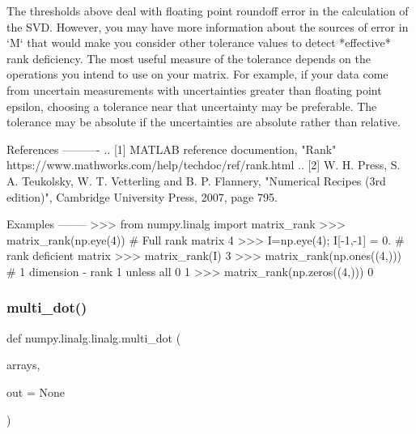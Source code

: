 \begin{DoxyVerb}
The thresholds above deal with floating point roundoff error in the
calculation of the SVD.  However, you may have more information about the
sources of error in `M` that would make you consider other tolerance values
to detect *effective* rank deficiency.  The most useful measure of the
tolerance depends on the operations you intend to use on your matrix.  For
example, if your data come from uncertain measurements with uncertainties
greater than floating point epsilon, choosing a tolerance near that
uncertainty may be preferable.  The tolerance may be absolute if the
uncertainties are absolute rather than relative.

References
----------
.. [1] MATLAB reference documention, "Rank"
       https://www.mathworks.com/help/techdoc/ref/rank.html
.. [2] W. H. Press, S. A. Teukolsky, W. T. Vetterling and B. P. Flannery,
       "Numerical Recipes (3rd edition)", Cambridge University Press, 2007,
       page 795.

Examples
--------
>>> from numpy.linalg import matrix_rank
>>> matrix_rank(np.eye(4)) # Full rank matrix
4
>>> I=np.eye(4); I[-1,-1] = 0. # rank deficient matrix
>>> matrix_rank(I)
3
>>> matrix_rank(np.ones((4,))) # 1 dimension - rank 1 unless all 0
1
>>> matrix_rank(np.zeros((4,)))
0
\end{DoxyVerb}
 \mbox{\label{namespacenumpy_1_1linalg_1_1linalg_adbfb447fdbc4ea61cba348c026fbacf7}} 
\subsubsection{\texorpdfstring{multi\+\_\+dot()}{multi\_dot()}}
{\footnotesize\ttfamily def numpy.\+linalg.\+linalg.\+multi\+\_\+dot (\begin{DoxyParamCaption}\item[{}]{arrays,  }\item[{}]{out = {\ttfamily None} }\end{DoxyParamCaption})}

